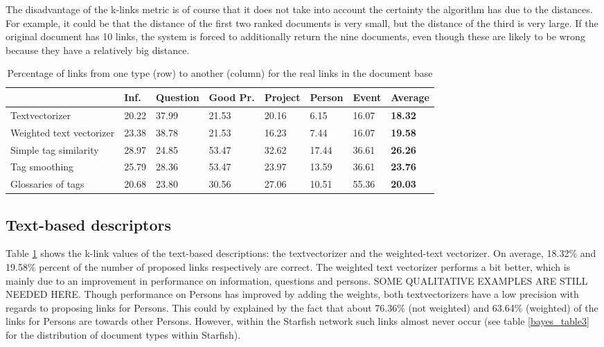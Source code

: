 The disadvantage of the k-links metric is of course that it does not take into account the certainty the algorithm has due to the distances. For example, it could be that the distance of the first two ranked documents is very small, but the distance of the third is very large. If the original document has 10 links, the system is forced to additionally return the nine documents, even though these are likely to be wrong because they have a relatively big distance. 

\begin{table}
\begin{tabular}{| l | l | l | l | l | l | l | l |}
\hline
 & Inf. &  Question &  Good Pr.& Project & Person &  Event & {\bf Average} \\
\hline
Textvectorizer & 20.22 & 37.99 & 21.53 & 20.16 & 6.15 & 16.07 & {\bf 18.32}\\
Weighted text vectorizer & 23.38 & 38.78 & 21.53 & 16.23 & 7.44 & 16.07 & {\bf 19.58} \\ 
Simple tag similarity & 28.97 & 24.85 & 53.47 & 32.62 & 17.44 & 36.61 & {\bf 26.26} \\
Tag smoothing & 25.79 & 28.36 & 53.47 & 23.97 & 13.59 & 36.61 & {\bf 23.76}\\
Glossaries of tags & 20.68 & 23.80 & 30.56 & 27.06 & 10.51 & 55.36 & {\bf 20.03}\\
\hline
\end{tabular}
\caption{Percentage of links from one type (row) to another (column) for the real links in the document base}
\label{klink}
\end{table}

\subsection{Text-based descriptors}
Table \ref{klink} shows the k-link values of the text-based descriptions: the textvectorizer and the weighted-text vectorizer. On average, 18.32\% and 19.58\% percent of the number of proposed links respectively are correct. The weighted text vectorizer performs a bit better, which is mainly due to an improvement in performance on information, questions and persons. SOME QUALITATIVE EXAMPLES ARE STILL NEEDED HERE. Though performance on Persons has improved by adding the weights, both textvectorizers have a low precision with regards to proposing links for Persons. This could by explained by the fact that about 76.36\% (not weighted) and 63.64\% (weighted) of the links for Persons are towards other Persons. However, within the Starfish network such links almost never occur (see table \ref{bayes_table3} for the distribution of document types within Starfish).

